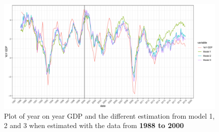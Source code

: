 \documentclass[12pt,a4paper,oneside]{book}
\begin{document}
\begin{figure}[H]
    \centering
    \includegraphics[scale=0.5]{Graphs/predictions2.pdf}
    \caption{Plot of year on year GDP and the different estimation from model 1, 2 and 3 when estimated with the data from \textbf{1988 to 2000}}
    \label{fig:predictions2}
\end{figure}
\end{document}
